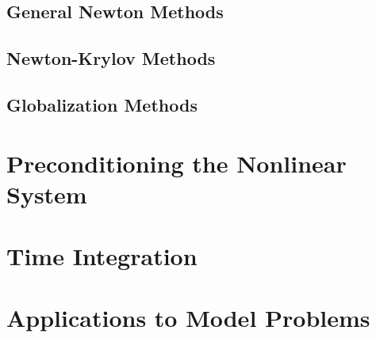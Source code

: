\subsection{General Newton Methods}
\label{subsec:newton_methods}

\subsection{Newton-Krylov Methods}
\label{subsec:newton_krylov_methods}

\subsection{Globalization Methods}
\label{subsec:globalization_methods}

\section{Preconditioning the Nonlinear System}
\label{sec:nonlinear_preconditioning}

\section{Time Integration}
\label{sec:time_integration}

\section{Applications to Model Problems}
\label{sec:nonlinear_applications}
